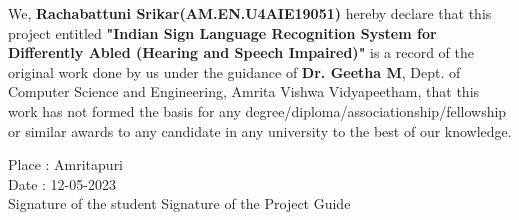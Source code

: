 \documentclass[oneside,12pt]{Classes/CUEDthesisPSnPDF}
\begin{document}
\vspace{1pt}

We, \textbf{Rachabattuni Srikar(AM.EN.U4AIE19051)} hereby declare that this project entitled \textbf{"Indian Sign Language Recognition System for Differently Abled (Hearing and Speech Impaired)"} is a record of the original work done by us under the guidance of \textbf{Dr. Geetha M}, Dept. of Computer Science and Engineering, Amrita Vishwa Vidyapeetham, that this work has not formed the basis for any degree/diploma/associationship/fellowship or similar awards to any candidate in any university to the best of our knowledge.\\

\vspace{60pt}

\begin{flushleft}

	Place	:	Amritapuri\\[1ex]

	Date	:	12-05-2023\\[15ex]

	Signature of the student \hspace{90pt}	Signature of the Project Guide\\

\end{flushleft}

\setcounter{secnumdepth}{3}

\setcounter{tocdepth}{3}

\frontmatter %



\end{document}
